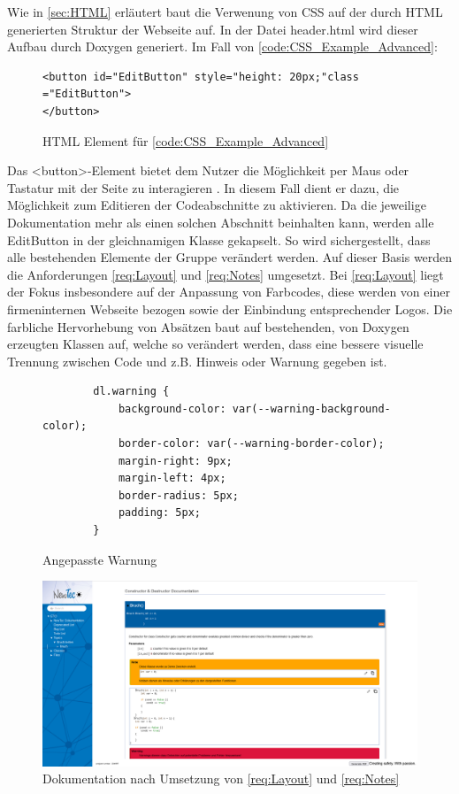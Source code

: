 \documentclass[11pt,a4paper]{report}
\begin{document}
\noindent
Wie in \ref{sec:HTML} erläutert baut die Verwenung von CSS auf der durch HTML generierten Struktur der Webseite auf. In der Datei \glqq header.html \grqq{} wird dieser Aufbau durch Doxygen generiert. Im Fall von \ref{code:CSS_Example_Advanced}:
\begin{figure}[h]
    \centering
    \begin{verbatim}
<button id="EditButton" style="height: 20px;"class ="EditButton">
</button>
    \end{verbatim}
    \caption{HTML Element für \ref{code:CSS_Example_Advanced}}
    \label{code:HTML_Element_für_side_nav}
\end{figure}

\noindent
Das <button>-Element bietet dem Nutzer die Möglichkeit per Maus oder Tastatur mit der Seite zu interagieren \cite{Button_Element}. In diesem Fall dient er dazu, die Möglichkeit zum Editieren der Codeabschnitte zu aktivieren. Da die jeweilige Dokumentation mehr als einen solchen Abschnitt beinhalten kann, werden alle \glqq EditButton \grqq{} in der gleichnamigen Klasse gekapselt. So wird sichergestellt, dass alle bestehenden Elemente der Gruppe verändert werden.\newpage
Auf dieser Basis werden die Anforderungen \ref{req:Layout} und \ref{req:Notes} umgesetzt. Bei \ref{req:Layout} liegt der Fokus insbesondere auf der Anpassung von Farbcodes, diese werden von einer firmeninternen Webseite bezogen sowie der Einbindung entsprechender Logos. Die farbliche Hervorhebung von Absätzen baut auf bestehenden, von Doxygen erzeugten Klassen auf, welche so verändert werden, dass eine bessere visuelle Trennung zwischen Code und z.B. Hinweis oder Warnung gegeben ist.
\begin{figure}[h]
    \centering
    \begin{verbatim}
        dl.warning {
            background-color: var(--warning-background-color);
            border-color: var(--warning-border-color);
            margin-right: 9px;
            margin-left: 4px;
            border-radius: 5px;
            padding: 5px;
        }
    \end{verbatim}
    \caption{Angepasste Warnung}
    \label{fig:warning_example}
\end{figure}

\begin{figure}[h]
    \centering
     \includegraphics[width=\textwidth]{images/Doxygen_A1undA2_Req.png}
    \caption{Dokumentation nach Umsetzung von \ref{req:Layout} und \ref{req:Notes}}
    \label{fig:doxygen-before}
\end{figure}
\end{document}
